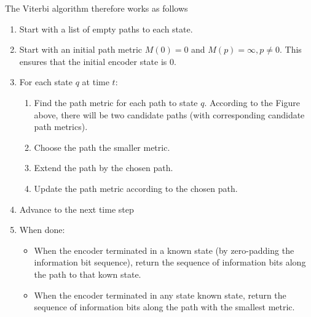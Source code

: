 The Viterbi algorithm therefore works as follows

\begin{enumerate}

\item Start with a list of empty paths to each state.

\item Start with an initial path metric $M(0) = 0$ and $M(p) = \infty, p \neq 0$. This ensures that the initial encoder state is $0$.

\item For each state $q$ at time $t$:

	\begin{enumerate}

		\item Find the path metric for each path to state $q$. According to the Figure above, there will be two candidate paths (with corresponding candidate path metrics).

		\item Choose the path the smaller metric.

		\item Extend the path by the chosen path.

		\item Update the path metric according to the chosen path.

	\end{enumerate}

\item Advance to the next time step

\item When done:

	\begin{itemize}

		\item When the encoder terminated in a known state (by zero-padding the information bit sequence), return the sequence of information bits along the path to that kown state.

		\item When the encoder terminated in any state known state, return the sequence of information bits along the path with the smallest metric.

	\end{itemize}

\end{enumerate}

